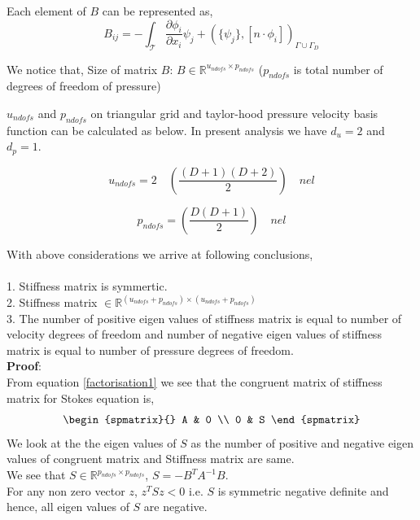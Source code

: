 \documentclass[a4paper,12pt]{book}
\begin{document}
Each element of $B$ can be represented as,\\
\begin{equation} \label{matrix B}
B_{ij} = - \int_\mathcal{T} \frac{\partial \phi_i}{\partial x_i} \psi_j + (\lbrace \psi_j \rbrace , [n \cdot \phi_i])_{\Gamma \cup \Gamma_D}
\end{equation}

We notice that, Size of matrix $B$: $B \in \mathbb{R}^{u_{ndofs} \times p_{ndofs}}$ ($p_{ndofs}$ is total number of degrees of freedom of pressure)

$u_{ndofs}$ and $p_{ndofs}$ on triangular grid and taylor-hood pressure velocity basis function can be calculated as below. In present analysis we have $d_u = 2$ and $d_p = 1$.

\begin{equation} \label{undofs}
u_{ndofs} = 2 \quad \left( \frac{(D+1)(D+2)}{2} \right) \quad nel
\end{equation}

\begin{equation} \label{pndofs}
p_{ndofs} = \left(\frac{D(D+1)}{2}\right) \quad nel
\end{equation}

With above considerations we arrive at following conclusions, \\
\\
1. Stiffness matrix is symmertic. \\
2. Stiffness matrix $ \in \mathbb{R}^{(u_{ndofs} + p_{ndofs}) \times (u_{ndofs} + p_{ndofs})}$\\
3. The number of positive eigen values of stiffness matrix is equal to number of velocity degrees of freedom and number of negative eigen values of stiffness matrix is equal to number of pressure degrees of freedom.\\
\textbf{Proof}:\\
From equation \eqref{factorisation1} we see that the congruent matrix of stiffness matrix for Stokes equation is,
\begin{equation}
\begin{spmatrix}{}
    A & 0 \\
    0 & S
\end{spmatrix}
\end{equation}
We look at the the eigen values of $S$ as the number of positive and negative eigen values of congruent matrix and Stiffness matrix are same.\\
We see that $S \in \mathbb{R}^{p_{ndofs} \times p_{ndofs}}$, $S = - B^T A^{-1} B$.\\ 
For any non zero vector $z$, $z^T S z < 0$ i.e. $S$ is symmetric negative definite and hence, all eigen values of $S$ are negative.
\end{document}
